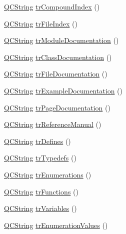 \begin{DoxyCompactItemize}
\item 
\hyperlink{class_q_c_string}{Q\+C\+String} \hyperlink{class_translator_portuguese_a7ad269611752df5e18f33bcc115d29ee}{tr\+Compound\+Index} ()
\item 
\hyperlink{class_q_c_string}{Q\+C\+String} \hyperlink{class_translator_portuguese_aff686b1ff820818edce54594005bba0e}{tr\+File\+Index} ()
\item 
\hyperlink{class_q_c_string}{Q\+C\+String} \hyperlink{class_translator_portuguese_a2a27386de1366de0e0e4f38fe73c2c11}{tr\+Module\+Documentation} ()
\item 
\hyperlink{class_q_c_string}{Q\+C\+String} \hyperlink{class_translator_portuguese_ae6f5816122b62bef0dc0090d8970c7b3}{tr\+Class\+Documentation} ()
\item 
\hyperlink{class_q_c_string}{Q\+C\+String} \hyperlink{class_translator_portuguese_a94df9bb8dedf2406561433e61c1dab48}{tr\+File\+Documentation} ()
\item 
\hyperlink{class_q_c_string}{Q\+C\+String} \hyperlink{class_translator_portuguese_afd4d5a5fa30767abf396574af3b22edf}{tr\+Example\+Documentation} ()
\item 
\hyperlink{class_q_c_string}{Q\+C\+String} \hyperlink{class_translator_portuguese_a74d1d84882e71ad90a84cacdd585f2f1}{tr\+Page\+Documentation} ()
\item 
\hyperlink{class_q_c_string}{Q\+C\+String} \hyperlink{class_translator_portuguese_a9fe10e7b93905d937ce2cf6936712b80}{tr\+Reference\+Manual} ()
\item 
\hyperlink{class_q_c_string}{Q\+C\+String} \hyperlink{class_translator_portuguese_af2519296f0977966fc38817b889cdc3c}{tr\+Defines} ()
\item 
\hyperlink{class_q_c_string}{Q\+C\+String} \hyperlink{class_translator_portuguese_ac580870c36dc2e0d8fc026dd718b08ff}{tr\+Typedefs} ()
\item 
\hyperlink{class_q_c_string}{Q\+C\+String} \hyperlink{class_translator_portuguese_a7a37ccb3c92adb7c0f9e6853462198f6}{tr\+Enumerations} ()
\item 
\hyperlink{class_q_c_string}{Q\+C\+String} \hyperlink{class_translator_portuguese_a8699679f6ed09ba4517c609689a4f6df}{tr\+Functions} ()
\item 
\hyperlink{class_q_c_string}{Q\+C\+String} \hyperlink{class_translator_portuguese_a7863f5711f87ec7863e5e77914cfa0d8}{tr\+Variables} ()
\item 
\hyperlink{class_q_c_string}{Q\+C\+String} \hyperlink{class_translator_portuguese_a1b3e078635dcf50123d39ca272fda3b9}{tr\+Enumeration\+Values} ()

\end{DoxyCompactItemize}
